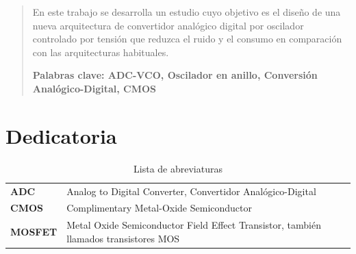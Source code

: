 \documentclass[12pt]{report} %
\begin{document}
\newpage %
\thispagestyle{empty}
\mbox{}

\renewcommand\abstractname{\large\bfseries\filcenter\uppercase{Resumen}}
\begin{abstract}
\thispagestyle{plain}
\setcounter{page}{3}
	
	En este trabajo se desarrolla un estudio cuyo objetivo es el diseño de una nueva arquitectura de convertidor analógico digital por oscilador controlado por tensión que reduzca el ruido y el consumo en comparación con las arquitecturas habituales.
	
	\textbf{Palabras clave: ADC-VCO, Oscilador en anillo, Conversión Analógico-Digital, CMOS}
	
	\vfill
\end{abstract}
	\newpage %
	\thispagestyle{empty}
	\mbox{}


\chapter*{Dedicatoria}

\setcounter{page}{5}
	
		
	\vfill
	
	\newpage %
	\thispagestyle{empty}
	\mbox{}
	


\tableofcontents
\thispagestyle{fancy}


\listoffigures
\thispagestyle{fancy}


\listoftables
\thispagestyle{fancy}


\newpage
\begin{table}[h!]
	\setlength{\arrayrulewidth}{0mm}
	\begin{center}
		\caption{Lista de abreviaturas}
		\label{tab:table1}
		\begin{tabular}{>{\bf}p{4cm}|p{10cm}}
			ADC & Analog to Digital Converter, Convertidor Analógico-Digital \\
			CMOS & Complimentary Metal-Oxide Semiconductor \\
			MOSFET & Metal Oxide Semiconductor Field Effect Transistor, también llamados transistores MOS \\
		\end{tabular}
	\end{center}
\end{table}
\end{document}
